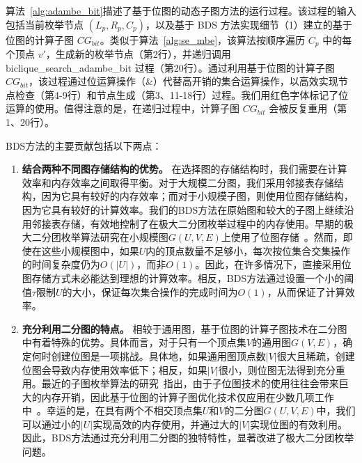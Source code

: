 


算法~\ref{alg:adambe_bit}描述了基于位图的动态子图方法的运行过程。该过程的输入包括当前枚举节点 $(L_p, R_p, C_p)$，以及基于 BDS 方法实现细节（1）建立的基于位图的计算子图 $CG_{bit}$。类似于算法~\ref{alg:se_mbe}，该算法按顺序遍历 $C_p$ 中的每个顶点 $v'$，生成新的枚举节点（第2行），并递归调用 \textsf{biclique\_search\_adambe\_bit} 过程（第20行）。通过利用基于位图的计算子图 $CG_{bit}$，该过程通过位运算操作（\&）代替高开销的集合运算操作，以高效实现节点检查（第4-9行）和节点生成（第3、11-18行）过程。我们用红色字体标记了位运算的使用。值得注意的是，在递归过程中，计算子图 $CG_{bit}$ 会被反复重用（第1、20行）。

  BDS方法的主要贡献包括以下两点：

  \begin{enumerate}
    \item \textbf{结合两种不同图存储结构的优势。} 在选择图的存储结构时，我们需要在计算效率和内存效率之间取得平衡。对于大规模二分图，我们采用邻接表存储结构，因为它具有较好的内存效率；而对于小规模子图，则使用位图存储结构，因为它具有较好的计算效率。我们的BDS方法在原始图和较大的子图上继续沿用邻接表存储，有效地控制了在极大二分团枚举过程中的内存使用。早期的极大二分团枚举算法研究在小规模图$G(U, V, E)$上使用了位图存储~\cite{lcmmbc07,iMBEA14}。然而，即使在这些小规模图中，如果$U$内的顶点数量不足够小，每次按位集合交集操作的时间复杂度仍为$O(|U|)$，而非$O(1)$。因此，在许多情况下，直接采用位图存储方式未必能达到理想的计算效率。相反，BDS方法通过设置一个小的阈值$\tau$限制$U$的大小，保证每次集合操作的完成时间为$O(1)$，从而保证了计算效率。
    
    \item \textbf{充分利用二分图的特点。} 相较于通用图，基于位图的计算子图技术在二分图中有着特殊的优势。具体而言，对于只有一个顶点集$V$的通用图$G(V,E)$，确定何时创建位图是一项挑战。具体地，如果通用图顶点数$|V|$很大且稀疏，创建位图会导致内存使用效率低下；相反，如果$|V|$很小，则位图无法得到充分重用。最近的子图枚举算法的研究~\cite{Graphset23}指出，由于子位图技术的使用往往会带来巨大的内存开销，因此基于位图的计算子图优化技术仅应用在少数几项工作中~\cite{Sandslash21,Kclique22,g2miner22}。幸运的是，在具有两个不相交顶点集$U$和$V$的二分图$G(U,V,E)$中，我们可以通过小的$|U|$实现高效的内存使用，并通过大的$|V|$实现位图的有效利用。因此，BDS方法通过充分利用二分图的独特特性，显著改进了极大二分团枚举问题。
  
\end{enumerate}


